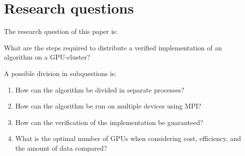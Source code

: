 \section{Research questions} \label{questions}
The research question of this paper is:

What are the steps required to distribute a verified implementation of an algorithm on a GPU-cluster?

A possible division in subquestions is:
\begin{enumerate}
    \item How can the algorithm be divided in separate processes?
    \item How can the algorithm be run on multiple devices using MPI?
    \item How can the verification of the implementation be guaranteed?
    \item What is the optimal number of GPUs when considering cost, efficiency, and the amount of data compared?
\end{enumerate}

